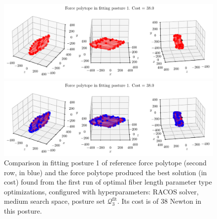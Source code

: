 \begin{figure}[!htb]
    \centering
    \captionsetup{justification=centering}
    
    \begin{minipage}{0.8\linewidth}
        \captionsetup{justification=centering}
        \centering
        \includegraphics[trim={0 0 0 0}, clip, width=1\linewidth]{img/chapter_4/reconstruction_stanford_imgs/polytope_racos_p3_opt_medium_output_3205633_trial_5_fitting_posture_1.pdf}
    \end{minipage}
    \begin{minipage}{0.8\linewidth}
        \captionsetup{justification=centering}
        \centering
        \includegraphics[trim={0 0 0 20}, clip, width=1\linewidth]{img/chapter_4/reconstruction_stanford_imgs/polytope_racos_p3_opt_medium_output_3205633_trial_5_fitting_posture_1_with_stanford.pdf}
    \end{minipage}
    \caption{Comparison in fitting posture 1 of reference force polytope (second row, in blue) and the force polytope produced the best solution (in cost) found from the first run of optimal fiber length parameter type optimizations, configured with hyperparameters: RACOS solver, medium search space, posture set $\mathcal{Q}_3^{\text{fit}}$. Its cost is of $38$ Newton in this posture.}
    \label{fig:polytope_racos_p3_opt_medium_output_3205633_trial_5_fitting_posture_1}
\end{figure}

